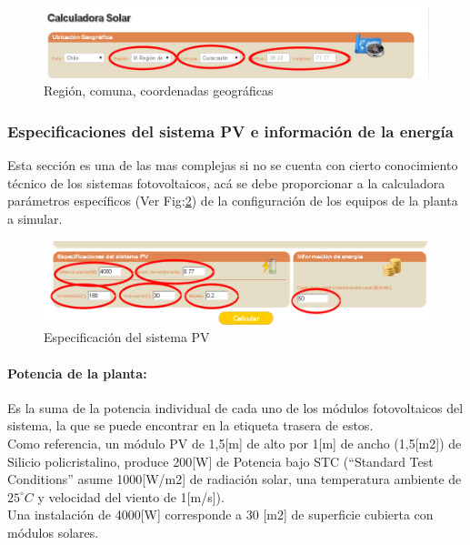 \begin{figure}[ht]
	\centering
	\includegraphics[scale=0.5]{./images/cap5chap1img7-2}
	\caption{Región, comuna, coordenadas geográficas}
	\label{region}
\end{figure}

\subsubsection{Especificaciones del sistema PV e información de la energía}
Esta sección es una de las mas complejas si no se cuenta con cierto conocimiento técnico de los sistemas fotovoltaicos, acá se debe proporcionar a la calculadora parámetros específicos (Ver Fig:\ref{sistemaPv}) de la configuración de los equipos de la planta a simular.\\

\begin{figure}[h]
        \centering
        \includegraphics[scale=0.4]{./images/cap5chap1img8}
        \caption{Especificación del sistema PV}
        \label{sistemaPv}
\end{figure}

\paragraph{Potencia de la planta:} Es la suma de la potencia individual de cada uno de los módulos fotovoltaicos del sistema, la que se puede encontrar en la etiqueta trasera de estos.\\
Como referencia, un módulo PV de 1,5[m] de alto por 1[m] de ancho (1,5[m2]) de Silicio policristalino, produce 200[W] de Potencia bajo STC (“Standard Test Conditions” asume 1000[W/m2] de radiación solar, una temperatura ambiente de $25^\circ C$ y velocidad del viento de 1[m/s]).\\ Una instalación de 4000[W] corresponde a 30 [m2] de superficie cubierta con módulos solares.
 

